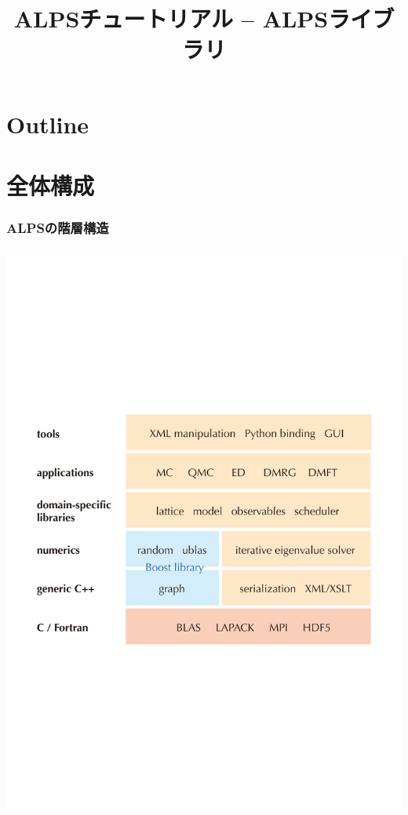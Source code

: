 \title{ALPSチュートリアル -- ALPSライブラリ}



\begin{frame}
  \titlepage
\end{frame}

\section*{Outline}
\begin{frame}
  \tableofcontents
\end{frame}

\section{全体構成}

\begin{frame}
  \frametitle{ALPSの階層構造}
  \begin{center}
    \includegraphics[height=0.65\textheight]{hierarchy.pdf}
  \end{center}
\end{frame}

